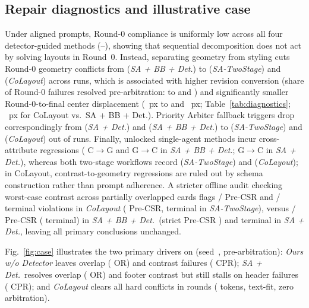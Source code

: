 \documentclass[conference]{IEEEtran}
\begin{document}
\subsection{Repair diagnostics and illustrative case}
Under aligned prompts, Round-0 compliance is uniformly low across all four
detector-guided methods (\vRzeroMin--\vRzeroMax{}), showing that sequential
decomposition does not act by solving layouts in Round~0. Instead, separating
geometry from styling cuts Round-0 geometry conflicts from \vRzeroGeomSABB{}
(\emph{SA + BB + Det.}) to \vRzeroGeomTwoStage{} (\emph{SA-TwoStage}) and
\vRzeroGeomFull{} (\emph{CoLayout}) across \vRunsPerMethod{} runs, which is associated with higher revision conversion (share of Round-0 failures
resolved pre-arbitration: \vConvSABB{} to \vConvTwoStage{} and \vConvFull{})
and significantly smaller Round-0-to-final center displacement
(\vDispSABB{}~px to \vDispTwoStage{} and \vDispFull{}~px;
Table~\ref{tab:diagnostics}; \vDDispFullBB{}~px for CoLayout vs.\ SA + BB +
Det.). Priority Arbiter fallback triggers drop correspondingly from
\vArbSADet{} (\emph{SA + Det.}) and \vArbSABB{} (\emph{SA + BB + Det.}) to
\vArbTwoStage{} (\emph{SA-TwoStage}) and \vArbFull{} (\emph{CoLayout}) out of
\vRunsPerMethod{} runs. Finally, unlocked single-agent methods incur
cross-attribute regressions (\vRegCGSABB{} C$\to$G and \vRegGCSABB{} G$\to$C in
\emph{SA + BB + Det.}; \vRegGCSADet{} G$\to$C in \emph{SA + Det.}), whereas both two-stage workflows record \vRegTwoStage{} (\emph{SA-TwoStage}) and
\vRegFull{} (\emph{CoLayout}); in CoLayout, contrast-to-geometry regressions are
ruled out by schema construction rather than prompt adherence. A stricter
offline audit checking worst-case contrast across partially overlapped cards
flags \vStradFlipPreFull/\vRunsPerMethod{} Pre-CSR and
\vStradFlipFinFull/\vRunsPerMethod{} terminal violations in \emph{CoLayout}
(\vStradFlipPreTwoStage{} Pre-CSR, \vStradFlipFinTwoStage{} terminal in
\emph{SA-TwoStage}), versus \vStradFlipPreSABB/\vRunsPerMethod{} Pre-CSR
(\vStradFlipFinSABB{} terminal) in \emph{SA + BB + Det.}\ (strict Pre-CSR
\vStrictPreSABB{}) and \vStradFlipFinSADet{} terminal in \emph{SA + Det.},
leaving all primary conclusions unchanged.

Fig.~\ref{fig:case} illustrates the two primary drivers on \emph{\vCaseTitle}
(seed~\vCaseSeed{}, pre-arbitration): \emph{Ours w/o Detector} leaves
\vCaseNDOv{} overlap (\vCaseNDOR{} OR) and \vCaseNDCp{} contrast failures
(\vCaseNDCPR{} CPR); \emph{SA + Det.}\ resolves overlap (\vCaseSDOR{} OR) and
footer contrast but still stalls on \vCaseSDCp{} header failures (\vCaseSDCPR{}
CPR); and \emph{CoLayout} clears all hard conflicts in \vCaseCoRnd{} rounds
(\vCaseCoTok{} tokens, \vCaseCoFit{} text-fit, zero arbitration).
\end{document}
